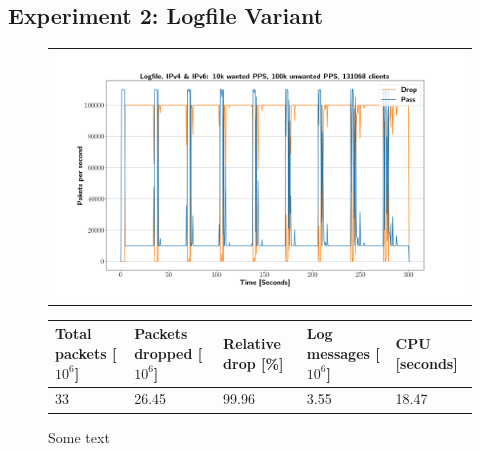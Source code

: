 \subsection{Experiment 2: Logfile Variant}

\begin{figure}[!h]
	\centering
	\scriptsize
	\begin{tabular}{c}
    	\centerline{\includegraphics[width=1.2\textwidth]{images/simplefail2ban_disk_ipv46_v10k_iv100k_c131068.png}}
	\end{tabular}
	\begin{tabular}{lllll}
		\toprule
		\textbf{Total packets [$10^6$]} & \textbf{Packets dropped [$10^6$]} & \textbf{Relative drop [\%]} & \textbf{Log messages [$10^6$]} & \textbf{CPU [seconds]} \\ \midrule 
		33 & 26.45 & 99.96 & 3.55 & 18.47 \\
	\bottomrule
	\end{tabular}
	\caption[Simplefail2ban, Logfile IPv4 \& IPv6, 100k \ac{PPS}]{Some text}
	\label{fig:simplefail2ban:disk:ip46:100k}
\end{figure}

